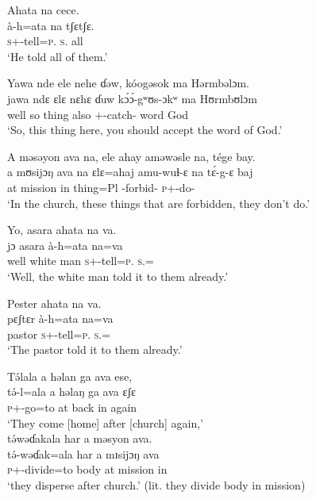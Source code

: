 \ea   Ahata  na  cece.\\
 \gll à-h=ata   na   tʃɛtʃɛ.\\
 \textsc{s}+{\PFV}-tell=\textsc{p}.{\IO}  \textsc{s}.{\DO}  all\\
 \glt ‘He told all of them.’ 
 \z

\ea Yawa  nde  ele  nehe  ɗəw,  kóogəsok ma  Hərmbəlɔm.  \\
 \gll jawa  ndɛ  ɛlɛ   nɛhɛ   ɗuw k\'ɔ\'ɔ-gʷʊs-ɔkʷ ma   Hʊrmbʊlɔm\\
 well    so  thing  {\DEM}  also  {\twoS}+{\POT}-catch-{\twoP}    word  God\\
 \glt ‘So, this thing here, you should accept the word of God.’ 
 \z

\ea A  məsəyon  ava  na,  ele  ahay  aməwəsle  na,  tége  bay.\\
 \gll a  mʊsijɔŋ    ava   na  ɛlɛ=ahaj  amu-wuɬ-ɛ     na   t\'ɛ-g-ɛ     baj\\
 at  mission    in  {\PSP}  thing=Pl        {\DEP}-forbid-{\CL}   {\PSP}  \textsc{p}+{\IFV}-do-{\CL}  {\NEG}\\
 \glt ‘In the church, these things that are forbidden, they don’t do.’
 \z

\ea Yo, asara  ahata  na  va.    \\
 \gll jɔ     asara     à-h=ata  na=va \\
 well {white man}  \textsc{s}+{\PFV}-tell=\textsc{p}.{\IO}  \textsc{s}.{\DO}={\PRF}\\
 \glt ‘Well, the white man told it to them already.’ 
 \z

\ea Pester  ahata  na  va.  \\
 \gll pɛʃtɛr   à-h=ata   na=va\\
 pastor  \textsc{s}+{\PFV}-tell=\textsc{p}.{\IO}  \textsc{s}.{\DO}={\PRF}\\
 \glt ‘The pastor told it to them already.’ 
 \z

\ea T\'əlala a  həlan  ga  ava  ese,   \\
 \gll t\'ə-l=ala   a   həlaŋ  ga   ava   ɛʃɛ   \\
 \textsc{p}+{\IFV}-go=to  at  back  {\ADJ}  in  again  \\
 \glt ‘They come [home] after [church] again,’\\
 
 \medskip
  t\'əwəɗakala  har  a  məsyon  ava.\\
 \gll t\'ə-wəɗak=ala   har   a   mɪsijɔŋ   ava\\
 \textsc{p}+{\IFV}-divide=to  body  at  mission  in\\
 \glt ‘they disperse after church.’ (lit. they divide body in mission)
 \z

